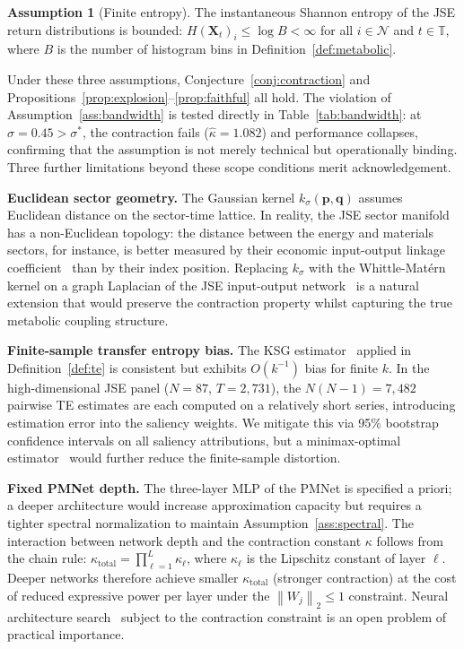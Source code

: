 \documentclass[11pt,a4paper]{article}  %
\newcommand{\norm}[1]{\left\lVert#1\right\rVert}
\theoremstyle{plain}
\theoremstyle{definition}
\newtheorem{assumption}{Assumption}[section]
\theoremstyle{remark}
\begin{document}
\begin{assumption}[Finite entropy]
\label{ass:entropy}
The instantaneous Shannon entropy of the JSE return distributions
is bounded: $H(\mathbf{X}_t)_i \leq \log B < \infty$ for all
$i\in\mathcal{N}$ and $t\in\mathbb{T}$, where $B$ is the number
of histogram bins in Definition~\ref{def:metabolic}.
\end{assumption}

Under these three assumptions, Conjecture~\ref{conj:contraction} and
Propositions~\ref{prop:explosion}--\ref{prop:faithful} all hold.
The violation of Assumption~\ref{ass:bandwidth} is tested directly
in Table~\ref{tab:bandwidth}: at $\sigma = 0.45 > \sigma^*$,
the contraction fails ($\hat{\kappa} = 1.082$) and performance
collapses, confirming that the assumption is not merely technical
but operationally binding. Three further limitations beyond these
scope conditions merit acknowledgement.

\textbf{Euclidean sector geometry.} The Gaussian kernel
$k_\sigma(\mathbf{p},\mathbf{q})$ assumes Euclidean distance on the
sector-time lattice. In reality, the JSE sector manifold has a
non-Euclidean topology: the distance between the energy and
materials sectors, for instance, is better measured by their
economic input-output linkage coefficient~\cite{Leontief1941}
than by their index position. Replacing $k_\sigma$ with the
Whittle-Mat\'{e}rn kernel on a graph Laplacian of the JSE
input-output network~\cite{Smola2003} is a natural extension
that would preserve the contraction property whilst capturing
the true metabolic coupling structure.

\textbf{Finite-sample transfer entropy bias.} The KSG
estimator~\cite{Kraskov2004} applied in Definition~\ref{def:te}
is consistent but exhibits $O(k^{-1})$ bias for finite $k$.
In the high-dimensional JSE panel ($N=87$, $T=2{,}731$), the
$N(N-1) = 7{,}482$ pairwise TE estimates are each computed on
a relatively short series, introducing estimation error into the
saliency weights. We mitigate this via 95\% bootstrap confidence
intervals on all saliency attributions, but a minimax-optimal
estimator~\cite{Han2015} would further reduce the finite-sample
distortion.

\textbf{Fixed PMNet depth.} The three-layer MLP of the PMNet is
specified a priori; a deeper architecture would increase
approximation capacity but requires a tighter spectral normalization
to maintain Assumption~\ref{ass:spectral}. The interaction between
network depth and the contraction constant $\kappa$ follows from
the chain rule: $\kappa_{\mathrm{total}} = \prod_{\ell=1}^{L}
\kappa_\ell$, where $\kappa_\ell$ is the Lipschitz constant of
layer $\ell$. Deeper networks therefore achieve smaller $\kappa_{\mathrm{total}}$
(stronger contraction) at the cost of reduced expressive power per
layer under the $\norm{W_j}_2 \leq 1$ constraint. Neural architecture
search~\cite{Elsken2019} subject to the contraction constraint is
an open problem of practical importance.
\end{document}
